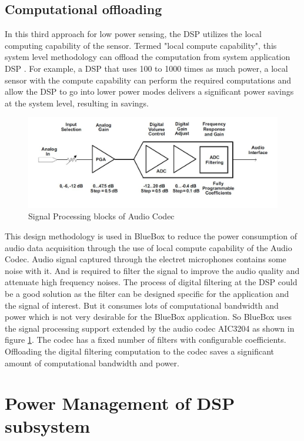  \subsection{Computational offloading}
 In this third approach for low power sensing, the DSP utilizes the local computing capability of the sensor. Termed "local compute capability", this system level methodology can offload the computation from system application DSP . For example, a DSP that uses 100 to 1000 times as much power, a local sensor with the compute capability can perform the required computations and allow the DSP to go into lower power modes delivers a significant power savings at the system level, resulting in savings.  
 
  \begin{figure}[h]
 	\centering
 	\includegraphics[scale = 0.5 ]{AIC_processingBlock.JPG}
 	\caption{Signal Processing blocks of Audio Codec\label{AIC_processingBlock}}
 \end{figure}
 
 This design methodology is used in BlueBox to reduce the power consumption of audio data acquisition through the use of local compute capability of the Audio Codec. Audio signal captured through the electret microphones contains some noise with it. And is required to filter the signal to improve the audio quality and attenuate high frequency noises. The process of digital filtering at the DSP could be a good solution as the filter can be designed specific for the application and the signal of interest. But it consumes lots of computational bandwidth and power which is not very desirable for the BlueBox application. So BlueBox uses the signal processing support extended by the audio codec AIC3204 as shown in figure \ref{AIC_processingBlock}. The codec has a fixed number of filters with configurable coefficients. Offloading the digital filtering computation to the codec saves a significant amount of computational bandwidth and power.
 
\section{Power Management of DSP subsystem }

